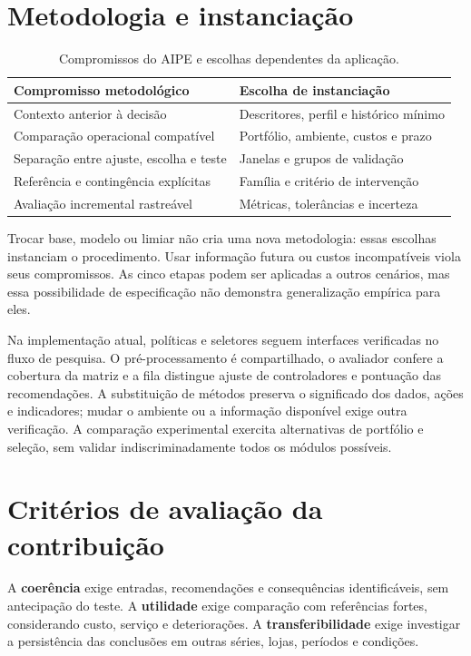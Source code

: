 \section{Metodologia e instanciação}
\begin{table}[htbp]\centering\small
\caption{Compromissos do AIPE e escolhas dependentes da aplicação.}\label{tab:metodo_instancia}
\begin{tabular}{@{}p{5.6cm}p{7cm}@{}}\toprule
Compromisso metodológico & Escolha de instanciação\\\midrule
Contexto anterior à decisão & Descritores, perfil e histórico mínimo\\
Comparação operacional compatível & Portfólio, ambiente, custos e prazo\\
Separação entre ajuste, escolha e teste & Janelas e grupos de validação\\
Referência e contingência explícitas & Família e critério de intervenção\\
Avaliação incremental rastreável & Métricas, tolerâncias e incerteza\\\bottomrule
\end{tabular}\end{table}

Trocar base, modelo ou limiar não cria uma nova metodologia: essas escolhas instanciam o procedimento. Usar informação futura ou custos incompatíveis viola seus compromissos. As cinco etapas podem ser aplicadas a outros cenários, mas essa possibilidade de especificação não demonstra generalização empírica para eles.

Na implementação atual, políticas e seletores seguem interfaces verificadas no fluxo de pesquisa. O pré-processamento é compartilhado, o avaliador confere a cobertura da matriz e a fila distingue ajuste de controladores e pontuação das recomendações. A substituição de métodos preserva o significado dos dados, ações e indicadores; mudar o ambiente ou a informação disponível exige outra verificação. A comparação experimental exercita alternativas de portfólio e seleção, sem validar indiscriminadamente todos os módulos possíveis.

\section{Critérios de avaliação da contribuição}
A \textbf{coerência} exige entradas, recomendações e consequências identificáveis, sem antecipação do teste. A \textbf{utilidade} exige comparação com referências fortes, considerando custo, serviço e deteriorações. A \textbf{transferibilidade} exige investigar a persistência das conclusões em outras séries, lojas, períodos e condições.

